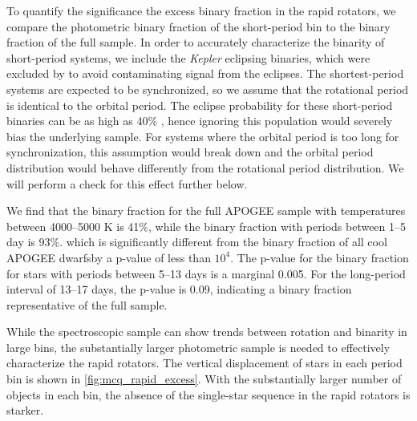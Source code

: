 \documentclass[manuscript]{aastex6}
\newcommand{\Kepler}{\mbox{\textit{Kepler}}}
\begin{document}
To quantify the significance the excess binary fraction in the rapid rotators, 
we compare the photometric binary fraction of the short-period bin to the
binary fraction of the full sample. In order to accurately characterize the 
binarity of short-period systems, we include the \Kepler{} eclipsing binaries, 
which were excluded by \citet{McQuillan14} to avoid contaminating signal from 
the eclipses. The shortest-period systems are expected to be synchronized, so
we assume that the rotational period is identical to the orbital period. 
The eclipse probability for these short-period binaries can be as high as 40\% 
\citep{Kirk16}, hence ignoring this population would severely
bias the underlying sample. For systems where the orbital period is too long
for synchronization, this assumption would break down and the orbital period
distribution would behave differently from the rotational period distribution.
We will perform a check for this effect further below.

We find that the binary fraction for the full APOGEE sample with temperatures
between 4000--5000 K is 41\%,  while the binary fraction with periods 
between 1--5 day is 93\%. which
is significantly different from the binary fraction of all cool APOGEE dwarfsby a
p-value of less than \(10^4\). The p-value for the binary fraction for stars
with periods between 5--13 days is a marginal 0.005. For the long-period
interval of 13--17 days, the p-value is 0.09, indicating a binary fraction
representative of the full sample.

\begin{figure*}[htb]
    \centering
    \caption{\emph{Top Left to Bottom Right:} Vertical displacement of all 
        cool \citet{McQuillan14} targets in period bins \(> 13\) days, 
        \(5--13\) days, \(1--5\) days, and less than 1 day. Pink stars denote 
        eclipsing binaries with orbital periods within the same ranges. The 
        green and purple lines denote the inclusive and conservative 
        photometric binary thresholds, 
    respectively}\label{fig:mcq_rapid_excess}
\end{figure*}

While the spectroscopic sample can show trends between rotation and binarity in
large bins, the substantially larger photometric sample is needed to 
effectively characterize the rapid rotators. The vertical displacement of stars 
in each period bin is shown in \cref{fig:mcq_rapid_excess}. With the 
substantially larger number of objects in each bin, the absence of the
single-star sequence in the rapid rotators is starker.
\end{document}
